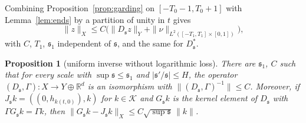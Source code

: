 \documentclass[11pt]{amsart}
\newtheorem{proposition}[theorem]{Proposition}
\theoremstyle{definition}
\theoremstyle{remark}
\theoremstyle{plain}
\numberwithin{equation}{section}
\newcommand{\RR}{\mathbb{R}}
\begin{document}
Combining Proposition~\ref{prop:garding} on $[-T_0-1,T_0+1]$ with
Lemma~\ref{lem:ends} by a partition of unity in $t$ gives
\begin{equation}\label{eq:localized-garding}
\|z\|_X\le C\bigl(\|D_{\mathfrak s} z\|_Y+\|\nu\|_{L^2([-T_1,T_1]\times[0,1])}\bigr),
\end{equation}
with $C$, $T_1$, ${\mathfrak s}_1$ independent of ${\mathfrak s}$, and the same for
$D_{\mathfrak s}^*$.

\begin{proposition}[uniform inverse without logarithmic loss]\label{prop:uniform-inverse}
There are ${\mathfrak s}_1$, $C$ such that for every scale with
$\sup{\mathfrak s}\le{\mathfrak s}_1$ and $|{\mathfrak s}'/{\mathfrak s}|\le H$, the operator
$(D_{\mathfrak s},\Gamma)\colon X\to Y\oplus\RR^d$ is an isomorphism with
$\|(D_{\mathfrak s},\Gamma)^{-1}\|\le C$. Moreover, if $J_{\mathfrak s} k=((0,h_{k(t,0)}),k)$
for $k\in\mathcal K$ and $G_{\mathfrak s} k$ is the kernel element of $D_{\mathfrak s}$
with $\Gamma G_{\mathfrak s} k=\Gamma k$, then $\|G_{\mathfrak s} k-J_{\mathfrak s} k\|_X\le
C\sqrt{\sup{\mathfrak s}}\,\|k\|$.
\end{proposition}
\end{document}
